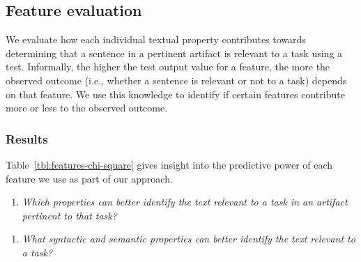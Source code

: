 \subsection{Feature evaluation}


We evaluate how each individual textual property contributes towards determining 
that a sentence in a pertinent artifact is relevant to a task 
using a  test. 
Informally, the higher the test output value for a feature, the more the observed outcome (i.e., whether a sentence is relevant or not to a task) depends 
on that feature.
We use this knowledge to identify if certain features contribute more or less 
to the observed outcome.





\subsubsection{Results}



Table~\ref{tbl:features-chi-square} gives insight into the predictive power of each feature we use as part of our approach. 










\vspace{1mm}
\setcounter{rq}{2}
\begin{enumerate}[label=\textit{RQ\arabic*},leftmargin=1.4cm]

\item \textit{Which properties can better identify the text relevant to a task in an artifact pertinent to that task?} 

\end{enumerate}




\vspace{1mm}
\setcounter{rq}{2}
\begin{enumerate}[label=\textit{RQ\arabic*},leftmargin=1.4cm]

\item \textit{What syntactic and semantic properties can better identify the text relevant to a task?} 

\end{enumerate}




